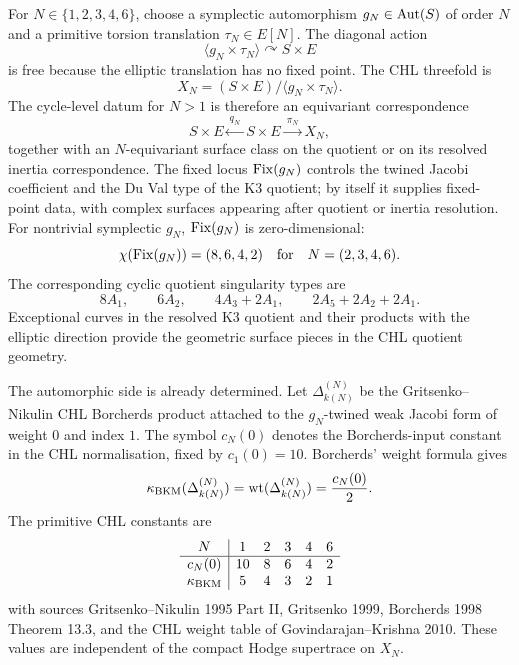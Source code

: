 For \(N\in\{1,2,3,4,6\}\), choose a symplectic automorphism
\(g_N\in\mathrm{Aut}(S)\) of order \(N\) and a primitive torsion translation
\(\tau_N\in E[N]\).  The diagonal action
\[
 \langle g_N\times \tau_N\rangle\curvearrowright S\times E
\]
is free because the elliptic translation has no fixed point.  The CHL
threefold is
\[
 X_N=(S\times E)/\langle g_N\times\tau_N\rangle.
\]
The cycle-level datum for \(N>1\) is therefore an equivariant
correspondence
\[
 S\times E \xleftarrow{\ q_N\ } S\times E
 \xrightarrow{\ \pi_N\ } X_N,
\]
together with an \(N\)-equivariant surface class on the quotient or on
its resolved inertia correspondence.  The fixed locus \(\mathrm{Fix}(g_N)\)
controls the twined Jacobi coefficient and the Du Val type of the K3
quotient; by itself it supplies fixed-point data, with complex surfaces
appearing after quotient or inertia resolution.  For nontrivial
symplectic \(g_N\), \(\mathrm{Fix}(g_N)\) is
zero-dimensional:
\[
 \chi(\mathrm{Fix}(g_N))=(8,6,4,2)\quad\text{for}\quad N=(2,3,4,6).
\]
The corresponding cyclic quotient singularity types are
\[
 8A_1,\qquad 6A_2,\qquad 4A_3+2A_1,\qquad 2A_5+2A_2+2A_1.
\]
Exceptional curves in the resolved K3 quotient and their products with
the elliptic direction provide the geometric surface pieces in the
CHL quotient geometry.

The automorphic side is already determined.  Let
\(\Delta_{k(N)}^{(N)}\) be the Gritsenko--Nikulin CHL Borcherds product
attached to the \(g_N\)-twined weak Jacobi form of weight \(0\) and
index \(1\).  The symbol \(c_N(0)\) denotes the Borcherds-input
constant in the CHL normalisation, fixed by \(c_1(0)=10\).  Borcherds'
weight formula gives
\[
 \kappa_{\mathrm{BKM}}(\Delta_{k(N)}^{(N)})=\mathrm{wt}(\Delta_{k(N)}^{(N)})
 =\frac{c_N(0)}2.
\]
The primitive CHL constants are
\[
\begin{array}{c|ccccc}
N & 1 & 2 & 3 & 4 & 6\\ \hline
c_N(0) & 10 & 8 & 6 & 4 & 2\\
\kappa_{\mathrm{BKM}} & 5 & 4 & 3 & 2 & 1
\end{array}
\]
with sources Gritsenko--Nikulin 1995 Part II, Gritsenko 1999,
Borcherds 1998 Theorem 13.3, and the CHL weight table of
Govindarajan--Krishna 2010.  These values are independent of the
compact Hodge supertrace on \(X_N\).

